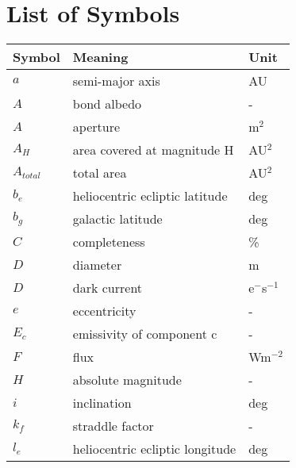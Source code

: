\listoffigures
\listoftables

\chapter*{List of Symbols}

\begin{table}[h!]
\centering
\begin{tabular}{l|l|l}
\textbf{Symbol} & \textbf{Meaning}                         & \textbf{Unit} \\ \hline
$a$               & semi-major axis                          & AU            \\
$A$               & bond albedo                              & -             \\
$A$               & aperture                                 & m$^2$            \\
$A_H$              & area covered at magnitude H              & AU$^2$           \\
$A_{total}$          & total area                               & AU$^2$           \\
$b_e$              & heliocentric ecliptic latitude           & deg           \\
$b_g$              & galactic latitude                        & deg           \\
$C$               & completeness                             & \%            \\
$D$               & diameter                                 & m             \\
$D$               & dark current                             & e$^-$s$^{-1}$          \\
$e$               & eccentricity                             & -             \\
$E_c$              & emissivity of component c                & -             \\
$F$               & flux                                     & Wm$^{-2}$          \\
$H$               & absolute magnitude                       & -             \\
$i$               & inclination                              & deg           \\
$k_f$              & straddle factor                          & -             \\
$l_e$              & heliocentric ecliptic longitude          & deg           \\

\end{tabular}
\end{table}
